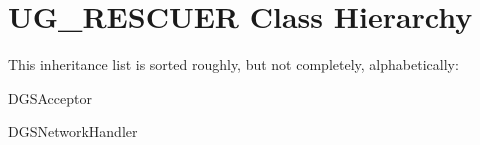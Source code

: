 \section{UG\_\-RESCUER Class Hierarchy}
This inheritance list is sorted roughly, but not completely, alphabetically:\begin{CompactList}
\item DGSAcceptor\item {}
\begin{CompactList}
\item DGSNetwork\-Handler\item {}
\item {}
\end{CompactList}
\end{CompactList}
